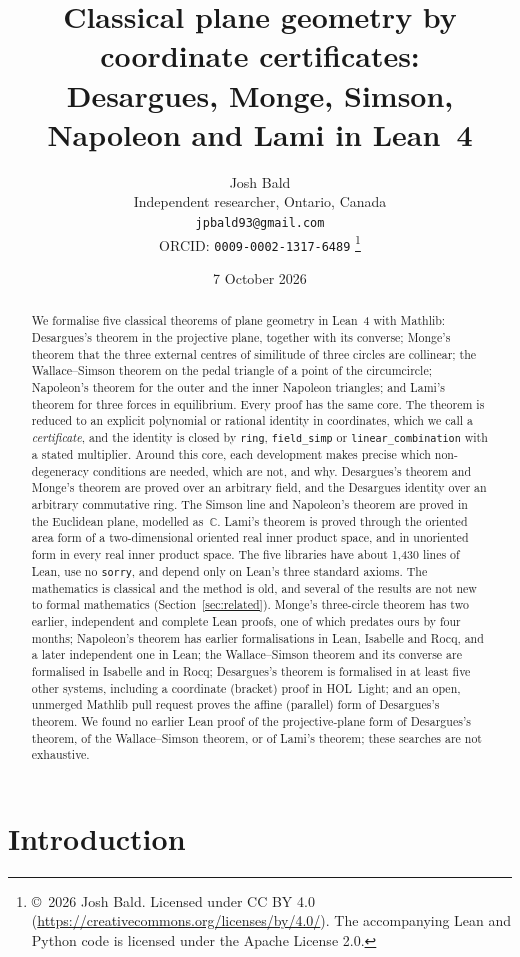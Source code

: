 \documentclass[11pt]{article}
\title{Classical plane geometry by coordinate certificates:\\
Desargues, Monge, Simson, Napoleon and Lami in Lean~4}
\author{Josh Bald\\ \small Independent researcher, Ontario, Canada\\ \small\texttt{jpbald93@gmail.com}\\
\small ORCID: \texttt{0009-0002-1317-6489}
\thanks{\copyright~2026 Josh Bald. Licensed under CC BY 4.0 (\url{https://creativecommons.org/licenses/by/4.0/}). The accompanying Lean and Python code is licensed under the Apache License 2.0.}}
\date{7 October 2026}
\theoremstyle{definition}
\theoremstyle{remark}
\newcommand{\lean}[1]{\texttt{#1}}
\newcommand{\CC}{\mathbb{C}}
\begin{document}
\maketitle

\begin{abstract}
We formalise five classical theorems of plane geometry in Lean~4 with Mathlib: Desargues's
theorem in the projective plane, together with its converse; Monge's theorem that the three
external centres of similitude of three circles are collinear; the Wallace--Simson theorem on the
pedal triangle of a point of the circumcircle; Napoleon's theorem for the outer and the inner
Napoleon triangles; and Lami's theorem for three forces in equilibrium. Every proof has the same
core. The theorem is reduced to an explicit polynomial or rational identity in coordinates, which
we call a \emph{certificate}, and the identity is closed by \lean{ring}, \lean{field\_simp} or
\lean{linear\_combination} with a stated multiplier. Around this core, each development makes
precise which non-degeneracy conditions are needed, which are not, and why. Desargues's theorem and
Monge's theorem are proved over an arbitrary field, and the Desargues identity over an arbitrary
commutative ring. The Simson line and Napoleon's theorem are proved in the Euclidean plane,
modelled as~$\CC$. Lami's theorem is proved through the oriented area form of a two-dimensional
oriented real inner product space, and in unoriented form in every real inner product space. The
five libraries have about 1{,}430 lines of Lean, use no \lean{sorry}, and depend only on Lean's
three standard axioms. The mathematics is classical and the method is old, and several of the
results are not new to formal mathematics (Section~\ref{sec:related}). Monge's three-circle
theorem has two earlier, independent and complete Lean proofs, one of which predates ours by four
months; Napoleon's theorem has
earlier formalisations in Lean, Isabelle and Rocq, and a later independent one in Lean; the Wallace--Simson theorem and its converse
are formalised in Isabelle and in Rocq; Desargues's theorem is formalised in at least five other
systems, including a coordinate (bracket) proof in HOL~Light; and an open, unmerged Mathlib pull
request proves the affine (parallel) form of Desargues's theorem. We found no earlier Lean proof
of the projective-plane form of Desargues's theorem, of the Wallace--Simson theorem, or of Lami's
theorem; these searches are not exhaustive.
\end{abstract}

\section{Introduction}
\end{document}
